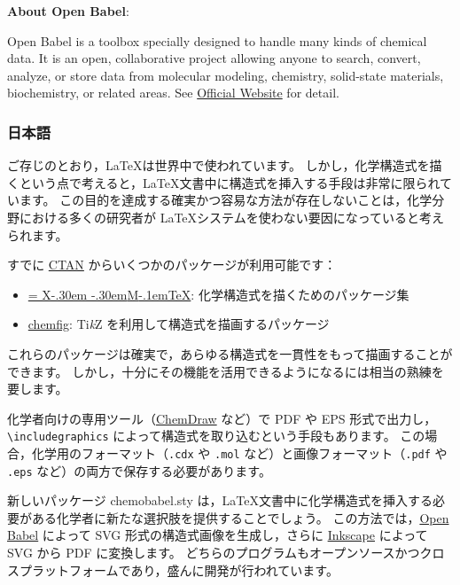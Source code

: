 \documentclass[12pt]{jsarticle}
\def\XyM{\ifnum\fam=-1\relax\fam=0\relax\fi\TestCount=\fam%
X\kern-.30em\smash{\raise.50ex\hbox{$\fam\TestCount\Upsilon$}}%
\kern-.30em{M}}
\def\XyMTeX{\XyM\kern-.1em\TeX}
\begin{document}
\noindent \textbf{About Open Babel}:

Open Babel is a toolbox specially designed to handle many kinds of chemical data.
It is an open, collaborative project allowing anyone to search, convert, analyze, or store data from molecular modeling, chemistry, solid-state materials, biochemistry, or related areas.
See \href{http://openbabel.org/}{Official Website} for detail.

\clearpage

\subsubsection{日本語}

ご存じのとおり，\LaTeX は世界中で使われています。
しかし，化学構造式を描くという点で考えると，\LaTeX 文書中に構造式を挿入する手段は非常に限られています。
この目的を達成する確実かつ容易な方法が存在しないことは，化学分野における多くの研究者が \LaTeX システムを使わない要因になっていると考えられます。

すでに \href{http://www.ctan.org/}{CTAN} からいくつかのパッケージが利用可能です：
\begin{itemize}
\item \href{http://www.ctan.org/pkg/xymtex}{\XyMTeX}: 化学構造式を描くためのパッケージ集
\item \href{http://www.ctan.org/pkg/chemfig}{\textsf{chemfig}}: Ti\textit{k}Z を利用して構造式を描画するパッケージ
\end{itemize}
これらのパッケージは確実で，あらゆる構造式を一貫性をもって描画することができます。
しかし，十分にその機能を活用できるようになるには相当の熟練を要します。

化学者向けの専用ツール（\href{http://www.cambridgesoft.com/Ensemble_for_Chemistry/ChemDraw/}{ChemDraw} など）で PDF や EPS 形式で出力し，\verb|\includegraphics| によって構造式を取り込むという手段もあります。
この場合，化学用のフォーマット（\verb|.cdx| や \verb|.mol| など）と画像フォーマット（\verb|.pdf| や \verb|.eps| など）の両方で保存する必要があります。

新しいパッケージ \textsf{chemobabel.sty} は，\LaTeX 文書中に化学構造式を挿入する必要がある化学者に新たな選択肢を提供することでしょう。
この方法では，\href{http://openbabel.org/}{Open Babel} によって SVG 形式の構造式画像を生成し，さらに \href{https://inkscape.org/ja/}{Inkscape} によって SVG から PDF に変換します。
どちらのプログラムもオープンソースかつクロスプラットフォームであり，盛んに開発が行われています。 \\
\end{document}
